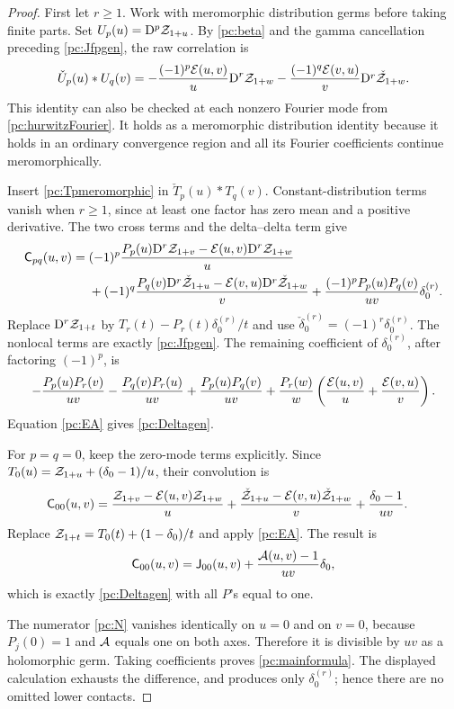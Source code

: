 \begin{proof}
First let $r\ge1$. Work with meromorphic distribution germs before taking finite parts. Set $U_p(u)=\mathrm D^p\mathcal Z_{1+u}$. By \eqref{pc:beta} and the gamma cancellation preceding \eqref{pc:Jfpgen}, the raw correlation is
\[
 \check U_p(u)*U_q(v)
 =-\frac{(-1)^p\mathcal E(u,v)}u\mathrm D^r\mathcal Z_{1+w}
  -\frac{(-1)^q\mathcal E(v,u)}v\check{\mathrm D^r\mathcal Z_{1+w}}.
\]
This identity can also be checked at each nonzero Fourier mode from \eqref{pc:hurwitzFourier}. It holds as a meromorphic distribution identity because it holds in an ordinary convergence region and all its Fourier coefficients continue meromorphically.

Insert \eqref{pc:Tpmeromorphic} in $\check T_p(u)*T_q(v)$. Constant-distribution terms vanish when $r\ge1$, since at least one factor has zero mean and a positive derivative. The two cross terms and the delta--delta term give
\begin{align*}
 \mathsf C_{pq}(u,v)={}&(-1)^p\frac{P_p(u)\mathrm D^r\mathcal Z_{1+v}-\mathcal E(u,v)\mathrm D^r\mathcal Z_{1+w}}u\\
 &+(-1)^q\frac{P_q(v)\check{\mathrm D^r\mathcal Z_{1+u}}
                   -\mathcal E(v,u)\check{\mathrm D^r\mathcal Z_{1+w}}}v
 +\frac{(-1)^pP_p(u)P_q(v)}{uv}\delta_0^{(r)}.
\end{align*}
Replace $\mathrm D^r\mathcal Z_{1+t}$ by $T_r(t)-P_r(t)\delta_0^{(r)}/t$ and use $\check\delta_0^{(r)}=(-1)^r\delta_0^{(r)}$. The nonlocal terms are exactly \eqref{pc:Jfpgen}. The remaining coefficient of $\delta_0^{(r)}$, after factoring $(-1)^p$, is
\[
 -\frac{P_p(u)P_r(v)}{uv}-\frac{P_q(v)P_r(u)}{uv}
 +\frac{P_p(u)P_q(v)}{uv}
 +\frac{P_r(w)}w\left(\frac{\mathcal E(u,v)}u+\frac{\mathcal E(v,u)}v\right).
\]
Equation \eqref{pc:EA} gives \eqref{pc:Deltagen}.

For $p=q=0$, keep the zero-mode terms explicitly. Since
$T_0(u)=\mathcal Z_{1+u}+(\delta_0-1)/u$, their convolution is
\begin{align*}
 \mathsf C_{00}(u,v)={}&\frac{\mathcal Z_{1+v}-\mathcal E(u,v)\mathcal Z_{1+w}}u
 +\frac{\check{\mathcal Z}_{1+u}-\mathcal E(v,u)\check{\mathcal Z}_{1+w}}v
 +\frac{\delta_0-1}{uv}.
\end{align*}
Replace $\mathcal Z_{1+t}=T_0(t)+(1-\delta_0)/t$ and apply \eqref{pc:EA}. The result is
\[
 \mathsf C_{00}(u,v)=\mathsf J_{00}(u,v)+\frac{\mathcal A(u,v)-1}{uv}\delta_0,
\]
which is exactly \eqref{pc:Deltagen} with all $P$'s equal to one.

The numerator \eqref{pc:N} vanishes identically on $u=0$ and on $v=0$, because $P_j(0)=1$ and $\mathcal A$ equals one on both axes. Therefore it is divisible by $uv$ as a holomorphic germ. Taking coefficients proves \eqref{pc:mainformula}. The displayed calculation exhausts the difference, and produces only $\delta_0^{(r)}$; hence there are no omitted lower contacts.
\end{proof}

